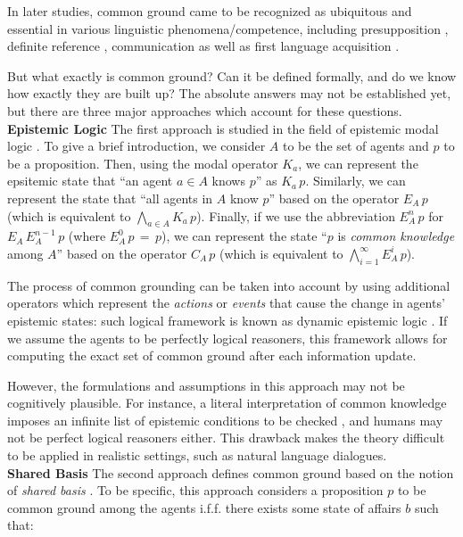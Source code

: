In later studies, common ground came to be recognized as ubiquitous and essential in various linguistic phenomena/competence, including presupposition \citep{stalnaker1978assertion}, definite reference \citep{Clark1981-CLADKA}, communication \citep{clark1996using} as well as first language acquisition \citep{clark2001grounding}.

But what exactly is common ground? Can it be defined formally, and do we know how exactly they are built up? The absolute answers may not be established yet, but there are three major approaches which account for these questions.\\

\noindent
\textbf{Epistemic Logic}\quad
The first approach is studied in the field of epistemic modal logic \citep{fagin2003reasoning}. To give a brief introduction, we consider $A$ to be the set of agents and $p$ to be a proposition. Then, using the modal operator $K_a$, we can represent the epsitemic state that ``an agent $a \in A$ knows $p$'' as $K_a\,p$. Similarly, we can represent the state that ``all agents in $A$ know $p$'' based on the operator $E_{A}\,p$ (which is equivalent to $\bigwedge_{a \in A} K_a\,p$). Finally, if we use the abbreviation $E_{A}^n\,p$ for $E_{A}\,E_{A}^{n-1}\,p$ (where $E_{A}^{0}\,p\,=\,p$), we can represent the state ``$p$ is \textit{common knowledge} among $A$'' based on the operator $C_{A}\,p$ (which is equivalent to $\bigwedge_{i=1}^{\infty} E_{A}^i\,p$).

The process of common grounding can be taken into account by using additional operators which represent the \textit{actions} or \textit{events} that cause the change in agents' epistemic states: such logical framework is known as dynamic epistemic logic \citep{van2007dynamic}. If we assume the agents to be perfectly logical reasoners, this framework allows for computing the exact set of common ground after each information update.

However, the formulations and assumptions in this approach may not be cognitively plausible. For instance, a literal interpretation of common knowledge imposes an infinite list of epistemic conditions to be checked \citep{Clark1981-CLADKA}, and humans may not be perfect logical reasoners either. This drawback makes the theory difficult to be applied in realistic settings, such as natural language dialogues.
\\

\noindent
\textbf{Shared Basis}\quad
The second approach defines common ground based on the notion of \textit{shared basis} \citep{lewis1969convention,Clark1981-CLADKA}. To be specific, this approach considers a proposition $p$ to be common ground among the agents i.f.f. there exists some state of affairs $b$ such that:

